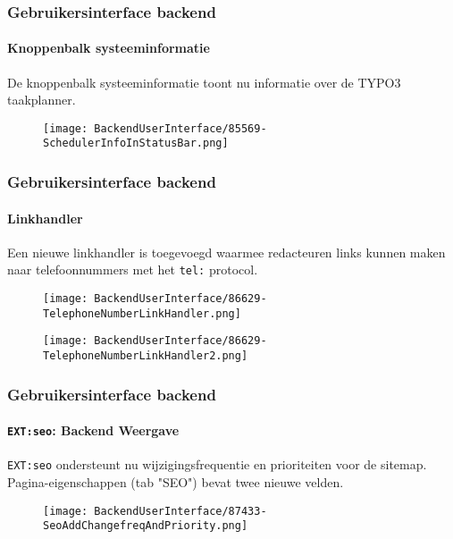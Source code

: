 
\begin{frame}[fragile]
	\frametitle{Gebruikersinterface backend}
	\framesubtitle{Knoppenbalk systeeminformatie}

	De knoppenbalk systeeminformatie toont nu informatie over de TYPO3 taakplanner.

	\begin{figure}
		\texttt{[image: BackendUserInterface/85569-SchedulerInfoInStatusBar.png]}
	\end{figure}

\end{frame}


\begin{frame}[fragile]
	\frametitle{Gebruikersinterface backend}
	\framesubtitle{Linkhandler}

	Een nieuwe linkhandler is toegevoegd waarmee redacteuren links kunnen maken naar
	telefoonnummers met het \texttt{tel:} protocol.

	\begin{figure}
		\texttt{[image: BackendUserInterface/86629-TelephoneNumberLinkHandler.png]}
	\end{figure}

	\begin{figure}
		\texttt{[image: BackendUserInterface/86629-TelephoneNumberLinkHandler2.png]}
	\end{figure}

\end{frame}


\begin{frame}[fragile]
	\frametitle{Gebruikersinterface backend}
	\framesubtitle{\texttt{EXT:seo}: Backend Weergave}

	\texttt{EXT:seo} ondersteunt nu wijzigingsfrequentie en prioriteiten voor de sitemap.
	Pagina-eigenschappen (tab "SEO") bevat twee nieuwe velden.

	\begin{figure}
		\texttt{[image: BackendUserInterface/87433-SeoAddChangefreqAndPriority.png]}
	\end{figure}

\end{frame}

